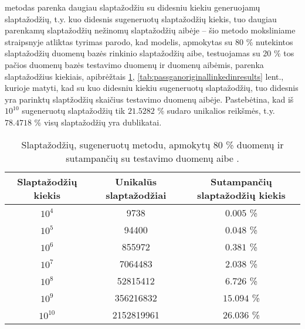 \documentclass{VUMIFInfBakalaurinis}
\begin{document}
 metodas parenka daugiau slaptažodžiu su didesniu kiekiu 
generuojamų slaptažodžių, t.y. kuo didesnis sugeneruotų slaptažodžių kiekis, tuo 
daugiau parenkamų slaptažodžių nežinomų slaptažodžių aibėje -- šio metodo 
moksliniame straipsnyje atliktas tyrimas parodo, kad modelis, apmokytas su 80 \% 
 nutekintos slaptažodžių duomenų bazės rinkinio slaptažodžių 
aibe, testuojamas su 20 \% tos pačios duomenų bazės testavimo duomenų ir 
 duomenų aibėmis, parenka slaptažodžius kiekiais, 
apibrėžtais \ref{tab:passganoriginalrockyouresults}, 
\ref{tab:passganoriginallinkedinresults} lent., kurioje matyti, kad su kuo 
didesniu kiekiu sugeneruotų slaptažodžių, tuo didesnis yra parinktų slaptžodžių 
skaičius testavimo duomenų aibėje. Pastebėtina, kad iš $10^10$ sugeneruotų 
slaptažodžių tik $21.5282$ \% sudaro unikalios reikšmės, t.y. $78.4718$ \% visų 
slaptažodžių yra dublikatai.

\begin{table}[hb]
  \centering
  \caption{
    Slaptažodžių, sugeneruotų  metodu, apmokytų 80 \% 
     duomenų ir sutampančių su  testavimo 
    duomenų aibe \cite{PassGAN}.
  }
  \begin{tabular}{|c|c|c|}
    \hline \textbf{Slaptažodžių kiekis} & \textbf{Unikalūs slaptažodžiai} & 
    \textbf{Sutampančių slaptažodžių kiekis} \\
    \hline $10^4$ & 9738 & $0.005$ \% \\
    \hline $10^5$ & 94400 & $0.048$ \% \\
    \hline $10^6$ & 855972 & $0.381$ \% \\
    \hline $10^7$ & 7064483 & $2.038$ \% \\
    \hline $10^8$ & 52815412 & $6.726$ \% \\
    \hline $10^9$ & 356216832 & $15.094$ \% \\
    \hline $10^{10}$ & 2152819961 & $26.036$ \% \\
    \hline
  \end{tabular}
  \label{tab:passganoriginalrockyouresults}
\end{table}
\end{document}
